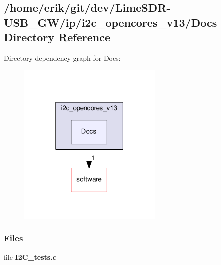 \subsection{/home/erik/git/dev/\+Lime\+S\+D\+R-\/\+U\+S\+B\+\_\+\+G\+W/ip/i2c\+\_\+opencores\+\_\+v13/\+Docs Directory Reference}
\label{dir_4e3d4e16dfe3dace411eb06eb9bb4d25}
Directory dependency graph for Docs\+:
\nopagebreak
\begin{figure}[H]
\begin{center}
\leavevmode
\includegraphics[width=197pt]{dir_4e3d4e16dfe3dace411eb06eb9bb4d25_dep}
\end{center}
\end{figure}
\subsubsection*{Files}
\begin{DoxyCompactItemize}
\item 
file {\bf I2\+C\+\_\+tests.\+c}
\end{DoxyCompactItemize}
